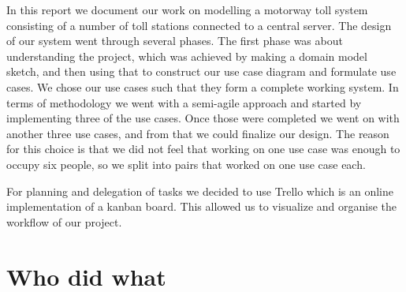 
In this report we document our work on modelling a motorway toll system consisting of a number of toll stations connected to a central server. The design of our system went through several phases. The first phase was about understanding the project, which was achieved by making a domain model sketch, and then using that to construct our use case diagram and formulate use cases. We chose our use cases such that they form a complete working system. In terms of methodology we went with a semi-agile approach and started by implementing three of the use cases. Once those were completed we went on with another three use cases, and from that we could finalize our design. The reason for this choice is that we did not feel that working on one use case was enough to occupy six people, so we split into pairs that worked on one use case each.

For planning and delegation of tasks we decided to use Trello which is an online implementation of a kanban board. This allowed us to visualize and organise the workflow of our project. 
\newpage
\section{Who did what}
